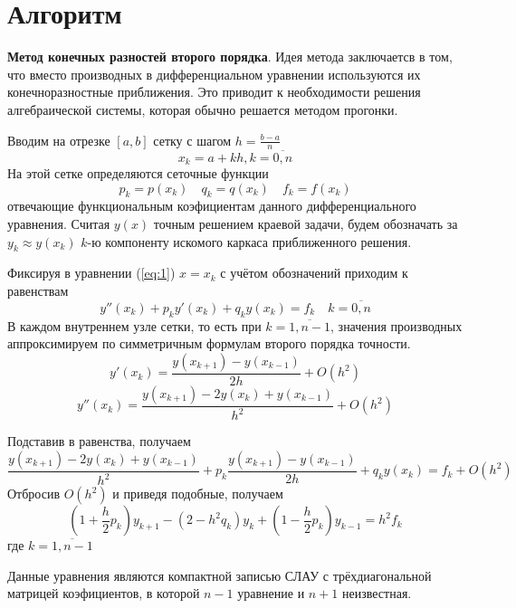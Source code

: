 \documentclass[a4paper]{article}
\begin{document}
\section{Алгоритм}\label{sec:S2}
\textbf{Метод конечных разностей второго порядка}.
Идея метода заключаетсв в том, что вместо производных в дифференциальном уравнении используются их конечноразностные
приближения. Это приводит к необходимости решения алгебраической системы, которая обычно решается методом прогонки.

Вводим на отрезке \([a,b]\) сетку с шагом \(h = \frac{b-a}{n}\) \[
  x_{k} = a + kh, k = \overline{0,n}
\]
На этой сетке определяются сеточные функции \[
  p_{k} = p(x_{k}) \quad q_{k} = q(x_{k}) \quad f_{k} = f(x_{k})
\]
отвечающие функциональным коэфициентам данного дифференциального уравнения. Считая \(y(x)\) точным решением краевой
задачи, будем обозначать за \(y_{k} \approx y(x_{k})\) \(k\)-ю компоненту искомого каркаса приближенного решения.

Фиксируя в уравнении (\ref{eq:1})  \(x = x_{k}\) с учётом обозначений приходим к равенствам \[
  y''(x_{k}) + p_{k}y'(x_{k}) + q_{k}y(x_{k}) = f_{k} \quad k = \overline{0,n}
\]
В каждом внутреннем узле сетки, то есть при \(k = \overline{1,n-1}\), значения производных аппроксимируем по
симметричным формулам второго порядка точности. \[
  y'(x_{k}) = \frac{y(x_{k+1})-y(x_{k-1})}{2h}+O(h^{2})
\]\[
  y''(x_{k}) = \frac{y(x_{k+1})-2y(x_{k})+y(x_{k-1})}{h^{2}} + O(h^{2})
\]

Подставив в равенства, получаем \[
  \frac{y(x_{k+1})-2y(x_{k})+y(x_{k-1})}{h^{2}} + p_{k}\frac{y(x_{k+1})-y(x_{k-1})}{2h} + q_{k}y(x_{k}) = f_{k} + O(h^{2})
\]
Отбросив \(O(h^{2})\) и приведя подобные, получаем
\[
  \left( 1 + \frac{h}{2}p_{k} \right)y_{k+1} - (2- h^{2}q_{k})y_{k} + \left(1-\frac{h}{2} p_{k}\right)y_{k-1} = h^{2}f_{k}
\]
где \(k = \overline{1,n-1}\)

Данные уравнения являются компактной записью СЛАУ с трёхдиагональной матрицей коэфициентов, в которой \(n-1\) уравнение
и \(n+1\) неизвестная.
\end{document}
